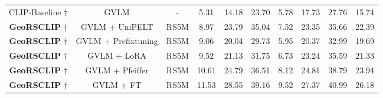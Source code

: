 \documentclass[journal]{IEEEtran}
\begin{document}
\begin{table*}
\begin{tabular}{cccccccccc}
CLIP-Baseline \cite{clip} $ \dagger $ & GVLM & - &	5.31  & 14.18  & 23.70  & 5.78  &	17.73  & 27.76  & 15.74   \\
\textbf{GeoRSCLIP} $ \dagger $ &GVLM + UniPELT & RS5M & 8.97  &23.79  &  35.04  &7.52  & 23.35  & 35.66  & 22.39 \\
\textbf{GeoRSCLIP} $ \dagger $ &GVLM + Prefix\-tuning & RS5M & 9.06  & 20.04  & 29.73  & 5.95  & 20.37   & 32.99   & 19.69 \\
\textbf{GeoRSCLIP} $ \dagger $ &GVLM + LoRA& RS5M & 9.52   & 21.13  & 31.75  &  6.73  & 23.24  & 35.59  & 21.33  \\
\textbf{GeoRSCLIP} $ \dagger $  &GVLM + Pfeiffer & RS5M &  10.61  & 24.79  & 36.51  & 8.12  & 24.81   & 38.79  & 23.94 \\

\textbf{GeoRSCLIP} $ \dagger $ & GVLM + FT & RS5M & 11.53   &	28.55  	& 39.16   & 	9.52   & 	27.37  	& 40.99   &	26.18  \\


\end{tabular}
\end{table*}
\end{document}
